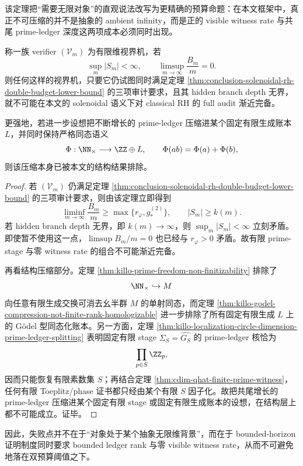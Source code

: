 该定理把“需要无限对象”的直观说法改写为更精确的预算命题：在本文框架中，真正不可压缩的并不是抽象的 ambient infinity，而是正的 visible witness rate 与共尾 prime-ledger 深度这两项成本必须同时出现。

\begin{corollary}[有限维视界机不可完备]\label{cor:conclusion-solenoidal-rh-bounded-horizon-incomplete}
称一族 verifier \((\mathcal V_m)\) 为有限维视界机，若
\[
\sup_m |S_m|<\infty,
\qquad
\limsup_{m\to\infty}\frac{B_m}{m}=0.
\]
则任何这样的视界机，只要它仍试图同时满足定理 \ref{thm:conclusion-solenoidal-rh-double-budget-lower-bound} 的三项审计要求，且其 hidden branch depth 无界，就不可能在本文的 solenoidal 语义下对 classical RH 的 full audit 渐近完备。

更强地，若进一步设想把不断增长的 prime-ledger 压缩进某个固定有限生成账本 \(L\)，并同时保持严格同态语义
\[
\Phi:\NN_{\times}\longrightarrow \ZZ\oplus L,
\qquad
\Phi(ab)=\Phi(a)+\Phi(b),
\]
则该压缩本身已被本文的结构结果排除。
\end{corollary}
\begin{proof}
若 \((\mathcal V_m)\) 仍满足定理 \ref{thm:conclusion-solenoidal-rh-double-budget-lower-bound} 的三项审计要求，则由该定理立即得到
\[
\liminf_{m\to\infty}\frac{B_m}{m}\ge \max\!\bigl\{r_\varphi,g_*^{(2)}\bigr\},
\qquad
|S_m|\ge k(m).
\]
若 hidden branch depth 无界，即 \(k(m)\to\infty\)，则 \(\sup_m |S_m|<\infty\) 立刻矛盾。即使暂不使用这一点，\(\limsup B_m/m=0\) 也已经与 \(r_\varphi>0\) 矛盾。故有限 prime-stage 与零 witness rate 的组合不可能渐近完备。

再看结构压缩部分。定理 \ref{thm:killo-prime-freedom-non-finitizability} 排除了
\[
\NN_{\times}\hookrightarrow M
\]
向任意有限生成交换可消去幺半群 \(M\) 的单射同态，而定理 \ref{thm:killo-godel-compression-not-finite-rank-homologizable} 进一步排除了所有固定有限生成 \(L\) 上的 Gödel 型同态化账本。另一方面，定理 \ref{thm:killo-localization-circle-dimension-prime-ledger-splitting} 表明固定有限 stage \(\Sigma_S=\widehat{G_S}\) 的 prime-ledger 核恰为
\[
\prod_{p\in S}\ZZ_p,
\]
因而只能恢复有限素数集 \(S\)；再结合定理 \ref{thm:cdim-qhat-finite-prime-witness}，任何有限 Toeplitz/phase 证书都只经由某个有限 \(S\) 因子化。故把共尾增长的 prime-ledger 压缩进某个固定有限 stage 或固定有限生成账本的设想，在结构层上都不可能成立。证毕。
\end{proof}

因此，失败点并不在于“对象处于某个抽象无限维背景”，而在于 bounded-horizon 证明制度同时要求 bounded ledger rank 与零 visible witness rate，从而不可避免地落在双预算阈值之下。

